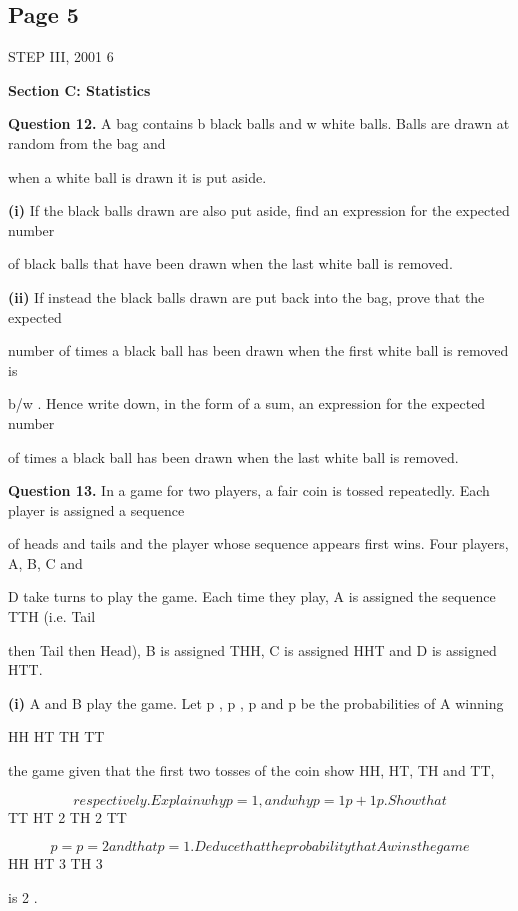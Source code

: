 \documentclass[12pt]{article}
\begin{document}
\subsection*{Page 5}
\begin{flushleft}
STEP III, 2001 6\par
\bigskip\textbf{Section C: Statistics}\par
\bigskip\textbf{Question 12.} A bag contains b black balls and w white balls. Balls are drawn at random from the bag and\par
when a white ball is drawn it is put aside.\par
\textbf{(i)} If the black balls drawn are also put aside, find an expression for the expected number\par
of black balls that have been drawn when the last white ball is removed.\par
\textbf{(ii)} If instead the black balls drawn are put back into the bag, prove that the expected\par
number of times a black ball has been drawn when the first white ball is removed is\par
b/w . Hence write down, in the form of a sum, an expression for the expected number\par
of times a black ball has been drawn when the last white ball is removed.\par
\bigskip\textbf{Question 13.} In a game for two players, a fair coin is tossed repeatedly. Each player is assigned a sequence\par
of heads and tails and the player whose sequence appears first wins. Four players, A, B, C and\par
D take turns to play the game. Each time they play, A is assigned the sequence TTH (i.e. Tail\par
then Tail then Head), B is assigned THH, C is assigned HHT and D is assigned HTT.\par
\textbf{(i)} A and B play the game. Let p , p , p and p be the probabilities of A winning\par
HH HT TH TT\par
the game given that the first two tosses of the coin show HH, HT, TH and TT,\par
\[respectively. Explain why p = 1 , and why p = 1 p + 1 p . Show that\]
TT HT 2 TH 2 TT\par
\[p = p = 2 and that p = 1 . Deduce that the probability that A wins the game\]
HH HT 3 TH 3\par
is 2 .\par

\end{flushleft}
\end{document}
